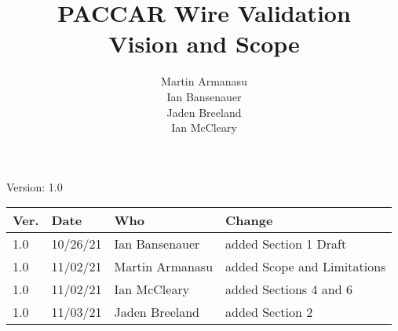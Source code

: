\documentclass[letterpaper,12pt]{article}
\title{PACCAR Wire Validation\\Vision and Scope}
\author{Martin Armanasu\\Ian Bansenauer\\Jaden Breeland\\Ian McCleary}
\begin{document}
\maketitle

\begin{center}
  Version: 1.0
\end{center}

\vfill
\begin{tabularx}{\linewidth}{|l|l|l|X|}\hline
Ver. & Date & Who & Change \\\hline
1.0  &10/26/21&  Ian Bansenauer   &  added Section 1 Draft \\\hline
1.0  &11/02/21&Martin Armanasu&added Scope and Limitations \\\hline
1.0  &11/02/21&Ian McCleary&added Sections 4 and 6 \\\hline
1.0  &11/03/21&Jaden Breeland&added Section 2 \\\hline
\end{tabularx}
\newpage







\end{document}
